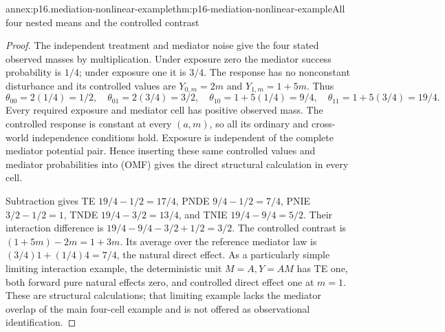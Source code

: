 \begin{annexitem}{annex:p16.mediation-nonlinear-example}{thm:p16-mediation-nonlinear-example}{All four nested means and the controlled contrast}
\begin{proof}
The independent treatment and mediator noise give the four stated
observed masses by multiplication. Under exposure zero the mediator
success probability is \(1/4\); under exposure one it is \(3/4\).
The response has no nonconstant disturbance and its controlled values
are \(Y_{0,m}=2m\) and \(Y_{1,m}=1+5m\). Thus
\[
 \theta_{00}=2(1/4)=1/2,\quad
 \theta_{01}=2(3/4)=3/2,\quad
 \theta_{10}=1+5(1/4)=9/4,\quad
 \theta_{11}=1+5(3/4)=19/4.
\]
Every required exposure and mediator cell has positive observed mass.
The controlled response is constant at every \((a,m)\), so all its
ordinary and cross-world independence conditions hold. Exposure is
independent of the complete mediator potential pair. Hence inserting
these same controlled values and mediator probabilities into (OMF)
gives the direct structural calculation in every cell.

Subtraction gives TE \(19/4-1/2=17/4\), PNDE \(9/4-1/2=7/4\),
PNIE \(3/2-1/2=1\), TNDE \(19/4-3/2=13/4\), and TNIE
\(19/4-9/4=5/2\). Their interaction difference is
\(19/4-9/4-3/2+1/2=3/2\). The controlled contrast is
\((1+5m)-2m=1+3m\). Its average over the reference mediator law
is \((3/4)1+(1/4)4=7/4\), the natural direct effect.
As a particularly simple limiting interaction example, the deterministic
unit \(M=A,Y=AM\) has TE one, both forward pure natural effects zero,
and controlled direct effect one at \(m=1\). These are structural
calculations; that limiting example lacks the mediator overlap of the
main four-cell example and is not offered as observational identification.
\end{proof}
\end{annexitem}

